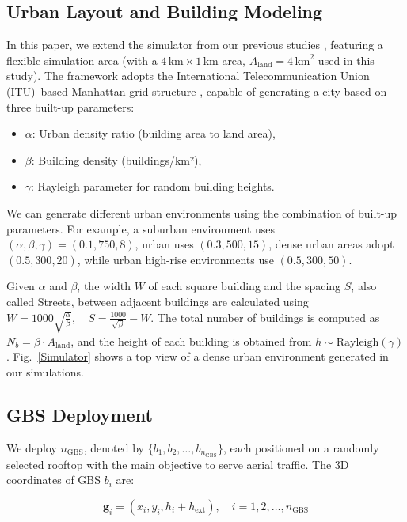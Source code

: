 \documentclass[10pt,conference]{IEEEtran}
\begin{document}
\subsection{Urban Layout and Building Modeling}
In this paper, we extend the simulator from our previous studies \cite{saboorEUCAP, saboorWCNC}, featuring a flexible simulation area (with a $4\,\mathrm{km} \times 1\,\mathrm{km}$ area, $A_{\text{land}} = 4\,\mathrm{km}^2$ used in this study). The framework adopts the International Telecommunication Union (ITU)--based Manhattan grid structure \cite{ITU}, capable of generating a city based on three built-up parameters:



\begin{itemize}
    \item $\alpha$: Urban density ratio (building area to land area),
    \item \(\beta\): Building density (buildings/km²),
    \item \(\gamma\): Rayleigh parameter for random building heights.
\end{itemize}

We can generate different urban environments using the combination of built-up parameters. For example, a suburban environment uses $(\alpha, \beta, \gamma) = (0.1, 750, 8)$, urban uses $(0.3, 500, 15)$, dense urban areas adopt $(0.5, 300, 20)$, while urban high-rise environments use $(0.5, 300, 50)$.

Given $\alpha$ and $\beta$, the width $W$ of each square building and the spacing $S$, also called Streets, between adjacent buildings are calculated using $W = 1000 \sqrt{\frac{\alpha}{\beta}}, \quad S = \frac{1000}{\sqrt{\beta}} - W$. The total number of buildings is computed as $N_b = \beta \cdot A_{\text{land}}$, and the height of each building is obtained from $h \sim \text{Rayleigh}(\gamma)$. Fig.~\ref{Simulator} shows a top view of a dense urban environment generated in our simulations.


\subsection{GBS Deployment}

We deploy $n_{\text{GBS}}$, denoted by $\{b_1, b_2, \dots, b_{n_{\text{GBS}}}\}$, each positioned on a randomly selected rooftop with the main objective to serve aerial traffic. The 3D coordinates of GBS $b_i$ are:

\begin{equation}
\mathbf{g}_i = (x_i, y_i, h_i + h_{\text{ext}}), \quad i = 1, 2, \dots, n_{\text{GBS}}
\end{equation}
\end{document}
